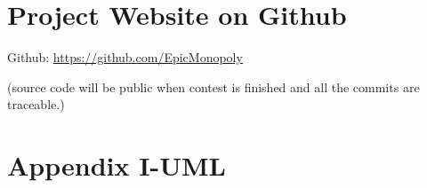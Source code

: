 \documentclass[a4paper,12pt]{article}
\begin{document}
\section{Project Website on Github}
Github: \href{https://github.com/EpicMonopoly}{https://github.com/EpicMonopoly}

(source code will be public when contest is finished and all the commits are traceable.)




\section*{Appendix I-UML}
\end{document}
